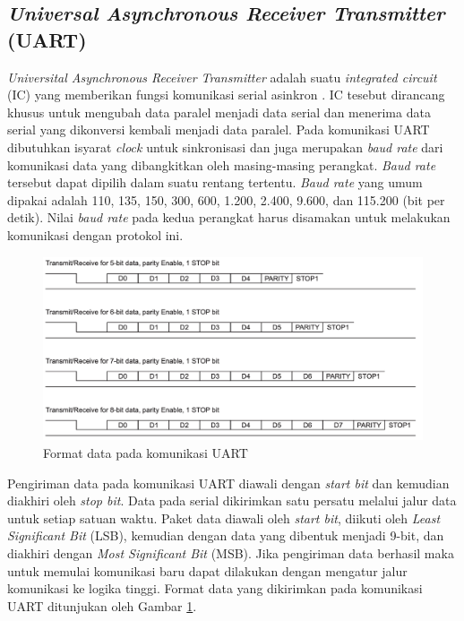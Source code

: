 \subsection{\textit{Universal Asynchronous Receiver Transmitter} (UART)}
\textit{Universital Asynchronous Receiver Transmitter} adalah suatu \textit{integrated circuit} (IC) yang memberikan fungsi komunikasi serial asinkron \cite{ti2010}. IC tesebut dirancang khusus untuk mengubah data paralel menjadi data serial dan menerima data serial yang dikonversi kembali menjadi data paralel. Pada komunikasi UART dibutuhkan isyarat \textit{clock} untuk sinkronisasi dan juga merupakan \textit{baud rate} dari komunikasi data yang dibangkitkan oleh masing-masing perangkat. \textit{Baud rate} tersebut dapat dipilih dalam suatu rentang tertentu. \textit{Baud rate} yang umum dipakai adalah 110, 135, 150, 300, 600, 1.200, 2.400, 9.600, dan 115.200 (bit per detik). Nilai \textit{baud rate} pada kedua perangkat harus disamakan untuk melakukan komunikasi dengan protokol ini.

\begin{figure}[H]
	\centering
	\includegraphics[width=12cm]{contents/chapter-2/uart-format.png}
	\caption{Format data pada komunikasi UART \cite{ti2010}}
	\label{Fig: uart-format}
\end{figure}

 Pengiriman data pada komunikasi UART diawali dengan \textit{start bit} dan kemudian diakhiri oleh \textit{stop bit}. Data pada serial dikirimkan satu persatu melalui jalur data untuk setiap satuan waktu. Paket data diawali oleh \textit{start bit}, diikuti oleh \textit{Least Significant Bit} (LSB), kemudian dengan data yang dibentuk menjadi 9-bit, dan diakhiri dengan \textit{Most Significant Bit} (MSB). Jika pengiriman data berhasil maka untuk memulai komunikasi baru dapat dilakukan dengan mengatur jalur komunikasi ke logika tinggi. Format data yang dikirimkan pada komunikasi UART ditunjukan oleh Gambar \ref{Fig: uart-format}.

